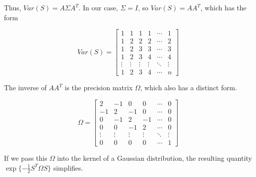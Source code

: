 \documentclass[
]{article}
\begin{document}
Thus, \(Var(S) = A \Sigma A^T\). In our case, \(\Sigma = I\), so \(Var(S) = AA^T\), which has the form

\[
  Var(S) = 
  \begin{bmatrix} 
    1 & 1 & 1 & 1 & \cdots & 1 \\
    1 & 2 & 2 & 2 & \cdots & 2 \\
    1 & 2 & 3 & 3 & \cdots & 3 \\
    1 & 2 & 3 & 4 & \cdots & 4 \\
    \vdots & \vdots & \vdots & \vdots & \ddots & \vdots \\
    1 & 2 & 3 & 4 & \cdots & n
  \end{bmatrix}
\]

The inverse of \(AA^T\) is the precision matrix \(\Omega\), which also has a distinct form.

\[
  \Omega = 
  \begin{bmatrix} 
    2 & -1 & 0 & 0 & \cdots & 0 \\
    -1 & 2 & -1 & 0 & \cdots & 0 \\
    0 & -1 & 2 & -1 & \cdots & 0 \\
    0 & 0 & -1 & 2 & \cdots & 0 \\
    \vdots & \vdots & \vdots & \vdots & \ddots & \vdots \\
    0 & 0 & 0 & 0 & \cdots & 1
  \end{bmatrix}
\]

If we pass this \(\Omega\) into the kernel of a Gaussian distribution, the resulting quantity \(\exp\{-\frac{1}{2}S^T \Omega S\}\) simplifies.
\end{document}
